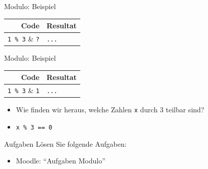 \begin{frame}[fragile]{Modulo: Beispiel}
    \begin{table}
        \begin{tabular}{r|l}
            \textbf{Code}     & \textbf{Resultat} \\\midrule\midrule
            \lstinline|1 % 3| & \lstinline|?|     \\\midrule
            \lstinline|2 % 3| & \lstinline|?|     \\\midrule
            \lstinline|3 % 3| & \lstinline|?|     \\\midrule
            \lstinline|4 % 3| & \lstinline|?|     \\\midrule
            \lstinline|5 % 3| & \lstinline|?|     \\\midrule
            \lstinline|6 % 3| & \lstinline|?|     \\\midrule
            \lstinline|...|   & \lstinline|...|
        \end{tabular}
    \end{table}
\end{frame}
\begin{frame}[fragile]{Modulo: Beispiel}
    \begin{table}
        \begin{tabular}{r|l}
            \textbf{Code}     & \textbf{Resultat} \\\midrule\midrule
            \lstinline|1 % 3| & \lstinline|1|     \\\midrule
            \lstinline|2 % 3| & \lstinline|2|     \\\midrule
            \lstinline|3 % 3| & \lstinline|0|     \\\midrule
            \lstinline|4 % 3| & \lstinline|1|     \\\midrule
            \lstinline|5 % 3| & \lstinline|2|     \\\midrule
            \lstinline|6 % 3| & \lstinline|0|     \\\midrule
            \lstinline|...|   & \lstinline|...|
        \end{tabular}
    \end{table}

    \begin{itemize}[<+->]
        \item Wie finden wir heraus, welche Zahlen \lstinline|x| durch 3 teilbar sind?
        \item \lstinline|x % 3 == 0|
    \end{itemize}
\end{frame}

\begin{frame}{Aufgaben}
    Lösen Sie folgende Aufgaben:
    \begin{itemize}
        \item Moodle: \enquote{Aufgaben Modulo}
    \end{itemize}
\end{frame}